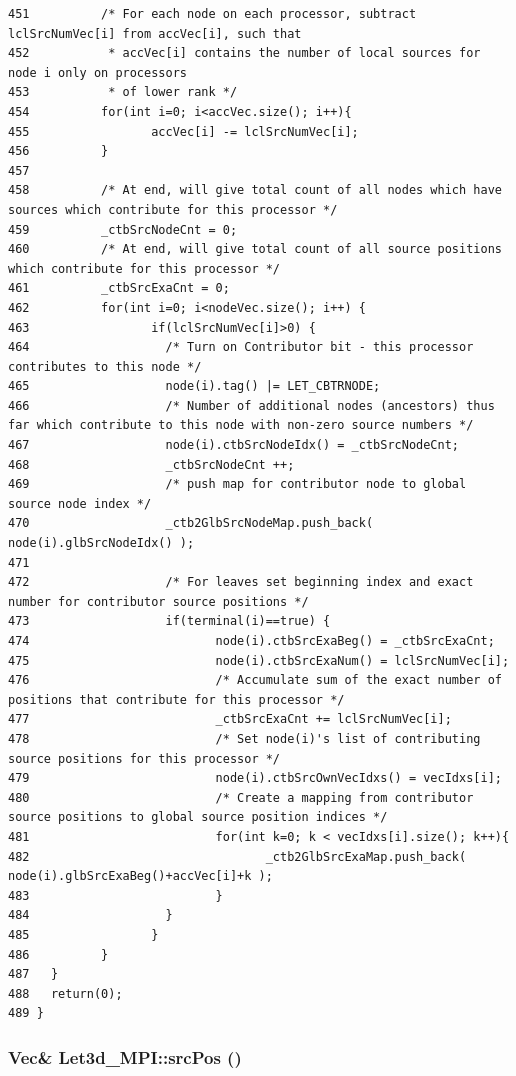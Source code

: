\begin{verbatim}
451          /* For each node on each processor, subtract lclSrcNumVec[i] from accVec[i], such that
452           * accVec[i] contains the number of local sources for node i only on processors
453           * of lower rank */
454          for(int i=0; i<accVec.size(); i++){
455                 accVec[i] -= lclSrcNumVec[i];
456          }
457 
458          /* At end, will give total count of all nodes which have sources which contribute for this processor */
459          _ctbSrcNodeCnt = 0;
460          /* At end, will give total count of all source positions which contribute for this processor */
461          _ctbSrcExaCnt = 0; 
462          for(int i=0; i<nodeVec.size(); i++) {
463                 if(lclSrcNumVec[i]>0) {
464                   /* Turn on Contributor bit - this processor contributes to this node */
465                   node(i).tag() |= LET_CBTRNODE;
466                   /* Number of additional nodes (ancestors) thus far which contribute to this node with non-zero source numbers */
467                   node(i).ctbSrcNodeIdx() = _ctbSrcNodeCnt; 
468                   _ctbSrcNodeCnt ++;
469                   /* push map for contributor node to global source node index */
470                   _ctb2GlbSrcNodeMap.push_back( node(i).glbSrcNodeIdx() );
471 
472                   /* For leaves set beginning index and exact number for contributor source positions */
473                   if(terminal(i)==true) { 
474                          node(i).ctbSrcExaBeg() = _ctbSrcExaCnt;
475                          node(i).ctbSrcExaNum() = lclSrcNumVec[i];
476                          /* Accumulate sum of the exact number of positions that contribute for this processor */
477                          _ctbSrcExaCnt += lclSrcNumVec[i];
478                          /* Set node(i)'s list of contributing source positions for this processor */
479                          node(i).ctbSrcOwnVecIdxs() = vecIdxs[i];
480                          /* Create a mapping from contributor source positions to global source position indices */
481                          for(int k=0; k < vecIdxs[i].size(); k++){
482                                 _ctb2GlbSrcExaMap.push_back( node(i).glbSrcExaBeg()+accVec[i]+k );
483                          }
484                   }
485                 }
486          }
487   }  
488   return(0);
489 }
\end{verbatim}\normalsize 


\subsubsection{\setlength{\rightskip}{0pt plus 5cm}Vec\& Let3d\_\-MPI::src\-Pos ()\hspace{0.3cm}{\tt  [inline]}}\label{classLet3d__MPI_caa1dae06f56964efa0f778b696dce61_caa1dae06f56964efa0f778b696dce61}


